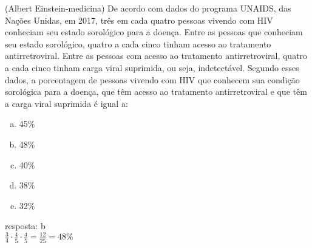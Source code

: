 \begin{ex}
  (Albert Einstein-medicina) De acordo com dados do programa UNAIDS, das Nações Unidas, em 2017, três em cada quatro pessoas vivendo com HIV conheciam seu estado sorológico para a doença. Entre as pessoas que conheciam seu estado sorológico, quatro a cada cinco tinham acesso ao tratamento antirretroviral. Entre as pessoas com acesso ao tratamento antirretroviral, quatro a cada cinco tinham carga viral suprimida, ou seja, indetectável. Segundo esses dados, a porcentagem de pessoas vivendo com HIV que conhecem sua condição sorológica para a doença, que têm acesso ao tratamento antirretroviral e que têm a carga viral suprimida é igual a:
   \begin{enumerate} [(a)]
       \item 45\%
       \item 48\%
       \item 40\%
       \item 38\%
       \item 32\%
   \end{enumerate}
     \begin{sol}
     resposta: b \\
     $\frac{3}{4}\cdot\frac{4}{5}\cdot\frac{4}{5}=\frac{12}{25}=48\%$
     \end{sol}
 \end{ex}